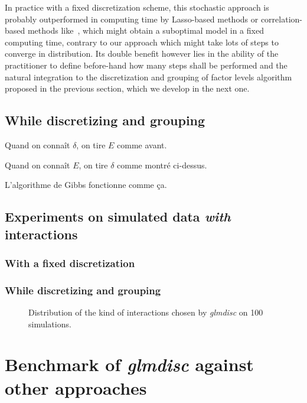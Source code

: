 In practice with a fixed discretization scheme, this stochastic approach is probably outperformed in computing time by Lasso-based methods or correlation-based methods like~\cite{simon}, which might obtain a suboptimal model in a fixed computing time, contrary to our approach which might take lots of steps to converge in distribution. Its double benefit however lies in the ability of the practitioner to define before-hand how many steps shall be performed and the natural integration to the discretization and grouping of factor levels algorithm proposed in the previous section, which we develop in the next one.

\subsection{While discretizing and grouping}

Quand on connaît $\delta$, on tire $E$ comme avant.

Quand on connaît $E$, on tire $\delta$ comme montré ci-dessus.

L'algorithme de Gibbs fonctionne comme ça.

\subsection{Experiments on simulated data \textit{with} interactions}

\subsubsection{With a fixed discretization}





\subsubsection{While discretizing and grouping}

\begin{figure}
\centering
\resizebox{\linewidth}{6cm}{%

}
\caption{\label{fig:simulated_interaction}Distribution of the kind of interactions chosen by \textit{glmdisc} on 100 simulations.}
\end{figure}


\section{Benchmark of \textit{glmdisc} against other approaches} \label{sec:exp}

